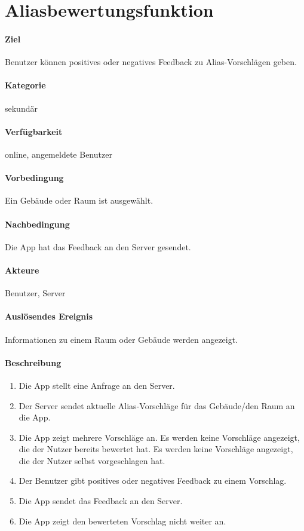 \section{Aliasbewertungsfunktion}
\label{Aliasbewertungsfunktion}
\paragraph{Ziel}
Benutzer können positives oder negatives Feedback zu Alias-Vorschlägen geben.
\paragraph{Kategorie}
sekundär
\paragraph{Verfügbarkeit}
online, angemeldete Benutzer
\paragraph{Vorbedingung}
Ein Gebäude oder Raum ist ausgewählt.
\paragraph{Nachbedingung}
Die App hat das Feedback an den Server gesendet.
\paragraph{Akteure}
Benutzer, Server
\paragraph{Auslösendes Ereignis}
Informationen zu einem Raum oder Gebäude werden angezeigt.
\paragraph{Beschreibung}
\begin{enumerate}
    \item Die App stellt eine Anfrage an den Server.
    \item Der Server sendet aktuelle Alias-Vorschläge für das Gebäude/den Raum an die App.
    \item Die App zeigt mehrere Vorschläge an. Es werden keine Vorschläge angezeigt, die der Nutzer bereits bewertet hat. Es werden keine Vorschläge angezeigt, die der Nutzer selbst vorgeschlagen hat.
    \item Der Benutzer gibt positives oder negatives Feedback zu einem Vorschlag.
    \item Die App sendet das Feedback an den Server.
    \item Die App zeigt den bewerteten Vorschlag nicht weiter an.
\end{enumerate}